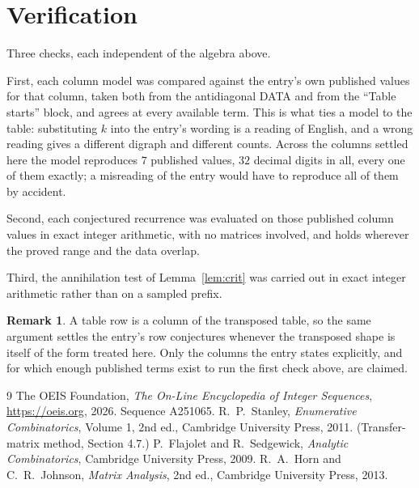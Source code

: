 \documentclass[11pt,a4paper]{article}
\theoremstyle{plain}
\theoremstyle{definition}
\newtheorem{remark}[theorem]{Remark}
\begin{document}
\section{Verification}

Three checks, each independent of the algebra above.

First, each column model was compared against the entry's own published values for that
column, taken both from the antidiagonal DATA and from the ``Table starts'' block, and agrees
at every available term. This is what ties a model to the table: substituting $k$ into the
entry's wording is a reading of English, and a wrong reading gives a different digraph and
different counts. Across the columns settled here the model reproduces $7$ published
values, $32$ decimal digits in all, every one of them exactly; a misreading of the entry
would have to reproduce all of them by accident.

Second, each conjectured recurrence was evaluated on those published column values in exact
integer arithmetic, with no matrices involved, and holds wherever the proved range and the
data overlap.

Third, the annihilation test of Lemma~\ref{lem:crit} was carried out in exact integer
arithmetic rather than on a sampled prefix.

\begin{remark}
A table row is a column of the transposed table, so the same argument settles the entry's row
conjectures whenever the transposed shape is itself of the form treated here. Only the columns
the entry states explicitly, and for which enough published terms exist to run the first check
above, are claimed.
\end{remark}

\begin{thebibliography}{9}
 The OEIS Foundation, \emph{The On-Line Encyclopedia of Integer
Sequences}, \url{https://oeis.org}, 2026. Sequence A251065.
 R.~P.~Stanley, \emph{Enumerative Combinatorics}, Volume 1, 2nd ed.,
Cambridge University Press, 2011. (Transfer-matrix method, Section 4.7.)
 P.~Flajolet and R.~Sedgewick, \emph{Analytic Combinatorics}, Cambridge
University Press, 2009.
 R.~A.~Horn and C.~R.~Johnson, \emph{Matrix Analysis}, 2nd ed., Cambridge
University Press, 2013.
\end{thebibliography}
\end{document}
